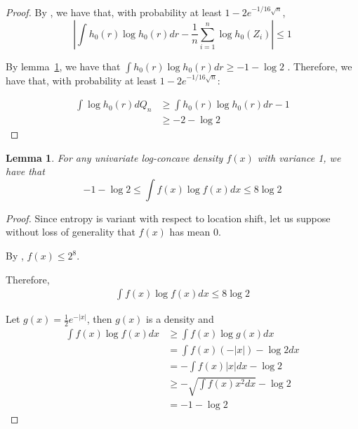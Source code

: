 \documentclass[12pt]{article}
\newtheorem{lemma}[theorem]{Lemma}
\begin{document}
\begin{proof}

  
  By \cite[][Theorem~1.1]{bobkov2011concentration}, we have that, with probability at least $1 - 2e^{-1/16 \sqrt{n}}$,
  \[
    \left| \int h_0(r) \log h_0(r) dr - \frac{1}{n} \sum_{i=1}^n \log h_0(Z_i) \right| \leq 1
  \]

  By lemma~\ref{lem:intrinsic_entropy_bound}, we have that $\int h_0(r) \log h_0(r) dr \geq -1 - \log 2$ . Therefore, we have that, with probability at least $1 - 2 e^{-1/16 \sqrt{n}}$:

  \begin{align*}
  \int \log h_0(r) d Q_n 
    &\geq \int h_0(r) \log h_0(r) dr - 1\\
    &\geq - 2 - \log 2
  \end{align*}                                                               
  
\end{proof}

\begin{lemma}
  \label{lem:intrinsic_entropy_bound}
  For any 
  univariate log-concave density $f(x)$ with variance 1, we have that
  \[
    -1 - \log 2 \leq    \int f(x) \log f(x) dx \leq 8 \log 2
  \]
\end{lemma}

\begin{proof}

  Since entropy is variant with respect to location shift, let us suppose without loss of generality that $f(x)$ has mean 0.

  
 By \cite[][Theorem~5.14]{lovasz2007geometry}, $f(x) \leq 2^8$. 
  
  Therefore,
  \begin{align*}
    \int f(x) \log f(x) dx \leq 8 \log 2
  \end{align*}

 Let $g(x) = \frac{1}{2} e^{-|x|}$, then $g(x)$ is a density and 
  \begin{align*}
    \int f(x) \log f(x) dx &\geq
                             \int f(x) \log g(x) dx \\
                           &= \int f(x) ( - |x|) - \log 2 dx \\
                           &= - \int f(x) |x| dx - \log 2 \\
                 &\geq - \sqrt{ \int f(x) x^2 dx } - \log 2 \\
     &= - 1 - \log 2
  \end{align*}

\end{proof}
  
\end{document}
